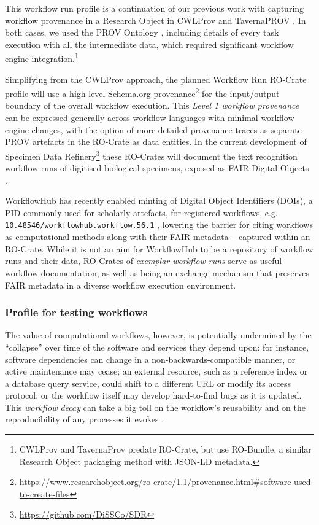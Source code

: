 \documentclass[ds,v1.1.2,openaccess]{iosart2x}%
\begin{document}
This workflow run profile is a continuation of our previous work with
capturing workflow provenance in a Research Object in CWLProv
\cite{doi:10.1093/gigascience/giz095} and TavernaPROV
\cite{doi:10.5281/zenodo.51314}. In both cases, we used the PROV Ontology
\cite{PROVO}, including details of every task execution with all the
intermediate data, which required significant workflow engine
integration.\footnote{CWLProv and TavernaProv predate RO-Crate, but use
RO-Bundle\cite{doi:10.5281/zenodo.12586}, a similar Research Object
packaging method with JSON-LD metadata.}

Simplifying from the CWLProv approach, the planned Workflow Run
RO-Crate profile will use a high level Schema.org
provenance\footnote{\url{https://www.researchobject.org/ro-crate/1.1/provenance.html\#software-used-to-create-files}}
for the input/output boundary of the overall workflow execution. This
\textit{Level 1 workflow provenance} \cite{doi:10.1093/gigascience/giz095} can be
expressed generally across workflow languages with minimal workflow
engine changes, with the option of more detailed provenance traces as
separate PROV artefacts in the RO-Crate as data entities. In the
current development of Specimen Data
Refinery\footnote{\url{https://github.com/DiSSCo/SDR}} \cite{doi:10.3897/rio.6.e57602}
these RO-Crates will document the text recognition workflow runs of
digitised biological specimens, exposed as FAIR Digital Objects
\cite{doi:10.3390/publications8020021}.

WorkflowHub has recently enabled minting of Digital Object Identifiers
(DOIs), a PID commonly used for scholarly artefacts, for registered
workflows, e.g. \texttt{10.48546/workflowhub.workflow.56.1}
\cite{doi:10.48546/workflowhub.workflow.56.1}, lowering the barrier for
citing workflows as computational methods along with their FAIR
metadata -- captured within an RO-Crate. While it is not an aim for
WorkflowHub to be a repository of workflow runs and their data,
RO-Crates of \textit{exemplar workflow runs} serve as useful workflow
documentation, as well as being an exchange mechanism that preserves
FAIR metadata in a diverse workflow execution environment.

\subsubsection{Profile for testing workflows}

The value of computational workflows, however, is potentially
undermined by the ``collapse'' over time of the software and services
they depend upon: for instance, software dependencies can change in a
non-backwards-compatible manner, or active maintenance may cease; an
external resource, such as a reference index or a database query
service, could shift to a different URL or modify its access protocol;
or the workflow itself may develop hard-to-find bugs as it is updated.
This \textit{workflow decay} can take a big toll on the workflow's reusability
and on the reproducibility of any processes it evokes
\cite{doi:10.1109/eScience.2012.6404482}.
\end{document}
